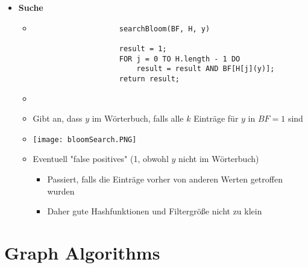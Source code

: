 \begin{itemize}
        \item \textbf{Suche}
            \begin{itemize}
                \item[]
                    \begin{verbatim}
                    searchBloom(BF, H, y)

                    result = 1;
                    FOR j = 0 TO H.length - 1 DO
                        result = result AND BF[H[j](y)];
                    return result;
                    \end{verbatim}
                \item[]
                \item Gibt an, dass $y$ im Wörterbuch, falls alle $k$ Einträge für $y$ in $BF=1$ sind
                \item[] \texttt{[image: bloomSearch.PNG]}
                \item Eventuell \string"false positives\string" (1, obwohl $y$ nicht im Wörterbuch)
                    \begin{itemize}
                        \item Passiert, falls die Einträge vorher von anderen Werten getroffen wurden
                        \item Daher gute Hashfunktionen und Filtergrö\ss e nicht zu klein
                    \end{itemize}
            \end{itemize}
    \end{itemize}

\section{Graph Algorithms}
